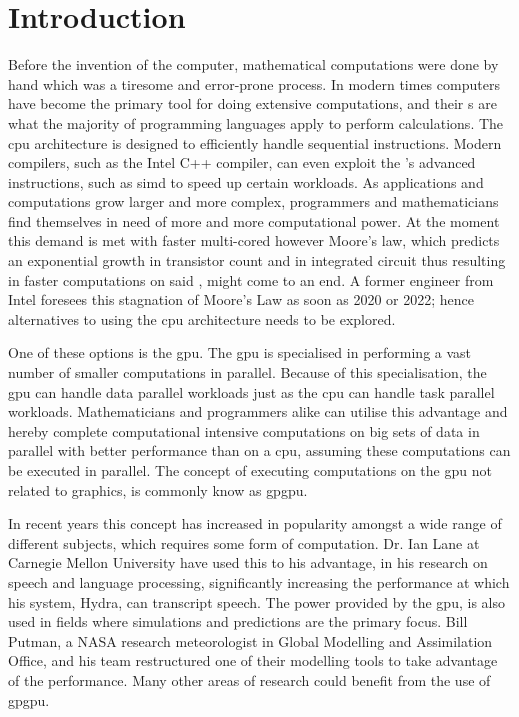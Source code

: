 \chapter{Introduction} %
\label{cha:introduction}
Before the invention of the computer, mathematical computations were done by hand which was a tiresome and error-prone process.
In modern times computers have become the primary tool for doing extensive computations, and their s are what the majority of programming languages apply to perform calculations.
The \acrshort{cpu} architecture is designed to efficiently handle sequential instructions. 
Modern compilers, such as the Intel C++ compiler, can even exploit the 's  advanced instructions, such as \acrfull{simd} to speed up certain workloads. \citep{INTEL_SIMD}
As applications and computations grow larger and more complex, programmers and mathematicians find themselves in need of more and more computational power. \citep[pp. 4]{OpenCL_AMD}
At the moment this demand is met with faster multi-cored  however Moore's law, which predicts an exponential growth in transistor count and in integrated circuit thus resulting in faster computations on said , might come to an end.
A former engineer from Intel foresees this stagnation of Moore's Law as soon as 2020 or 2022; hence alternatives to using the \acrshort{cpu} architecture needs to be explored.\citep{Moore2013}

One of these options is the \acrfull{gpu}.
The \acrshort{gpu} is specialised in performing a vast number of smaller computations in parallel.
Because of this specialisation, the \acrshort{gpu} can handle data parallel workloads just as the \acrshort{cpu} can handle task parallel workloads.
Mathematicians and programmers alike can utilise this advantage and hereby complete computational intensive computations on big sets of data in parallel with better performance than on a \acrshort{cpu}, assuming these computations can be executed in parallel.
The concept of executing computations on the \acrshort{gpu} not related to graphics, is commonly know as \acrfull{gpgpu}.

In recent years this concept has increased in popularity amongst a wide range of different subjects, which requires some form of computation.
Dr. Ian Lane at Carnegie Mellon University have used this to his advantage, in his research on speech and language processing, significantly increasing the performance at which his system, Hydra, can transcript speech. \citep{NvidiaSpotlightIan}
The power provided by the \acrshort{gpu}, is also used in fields where simulations and predictions are the primary focus. 
Bill Putman, a NASA research meteorologist in Global Modelling and Assimilation Office, and his team restructured one of their modelling tools to take advantage of the  performance. \citep{NvidiaSpotlightNasa}
Many other areas of research could benefit from the use of \acrshort{gpgpu}.

